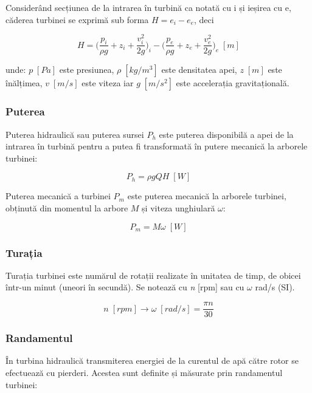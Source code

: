 Considerând secțiunea de la intrarea în turbină ca notată cu i și ieșirea cu e, căderea turbinei se exprimă sub forma $H=e_i-e_e$, deci

\begin{equation}
H=\bigg(\frac{p_i}{{\rho}g}+z_i+\frac{v_i^2}{2g}\bigg)_i-\bigg(\frac{p_e}{{\rho}g}+z_e+\frac{v_e^2}{2g}\bigg)_e \;[\si{m}]
\end{equation}

unde: $p\;[\si{Pa}]$ este presiunea, ${\rho}\;[\si{kg/m^3}]$ este densitatea apei, $z\;[\si{m}]$ este înălțimea, $v\;[\si{m/s}]$ este viteza iar $g\;[\si{m/s^2}]$ este accelerația gravitațională.

\subsubsection{Puterea}

Puterea hidraulică sau puterea sursei $P_h$ este puterea disponibilă a apei de la intrarea în turbină pentru a putea fi transformată în putere mecanică la arborele turbinei:

\begin{equation}
P_h={\rho}gQH\; [\si{W}]
\end{equation}

Puterea mecanică a turbinei $P_m$ este puterea mecanică la arborele turbinei, obținută din momentul la arbore $M$ și viteza unghiulară $\omega$:

\begin{equation}
P_m=M{\omega}\; [\si{W}]
\end{equation}

\subsubsection{Turația}

Turația turbinei este numărul de rotații realizate în unitatea de timp, de obicei într-un minut (uneori în secundă). Se notează cu \textit{n} [rpm] sau cu \(\omega\) rad/s (SI).

\begin{equation}
n\; [\si{rpm}]\rightarrow{\omega}\; [\si{rad/s}]=\frac{{\pi}n}{30}
\end{equation}


\subsubsection{Randamentul}

În turbina hidraulică transmiterea energiei de la curentul de apă către rotor se efectuează cu pierderi. Acestea sunt definite și măsurate prin randamentul turbinei:

